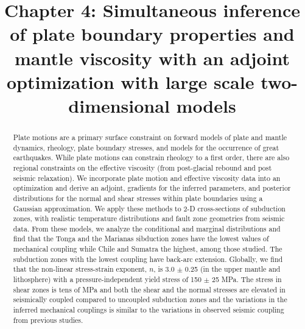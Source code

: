 \documentclass[12pt]{article}
\date{}
\title{Chapter 4: Simultaneous inference of plate boundary properties and mantle viscosity with an adjoint optimization with large scale two-dimensional models}
\begin{document}
\maketitle
\begin{abstract}
 Plate motions are a primary surface constraint on forward models of plate and mantle dynamics, rheology, plate boundary stresses, and models for the occurrence of great earthquakes. While plate motions can constrain rheology to a first order, there are also regional constraints on the effective viscosity (from post-glacial rebound and post seismic relaxation). 
We incorporate plate motion and effective viscosity data into an optimization and derive an adjoint, gradients for the inferred parameters, and posterior distributions for the normal and shear stresses within plate boundaries using a Gaussian approximation. 
We apply these methods to 2-D cross-sections of subduction zones, with realistic temperature distributions and fault zone geometries from seismic data. From these models, we analyze the conditional and marginal distributions and find that the 
Tonga and the Marianas sibduction zones have the lowest values of mechanical coupling while Chile and Sumatra the highest, among those studied. The subduction zones with the lowest coupling have back-arc extension. Globally, we find that the non-linear stress-strain exponent, $n$, is 3.0 $\pm$ 0.25 (in the upper mantle and lithosphere) with a pressure-independent yield stress of 150 $\pm$ 25 MPa. The stress in shear zones is tens of MPa and both the shear and the normal stresses are elevated in seismically coupled compared to uncoupled subduction zones and the variations in the inferred mechanical couplings is similar to the variations in observed seismic coupling from previous studies.
\end{abstract} 
\end{document}
